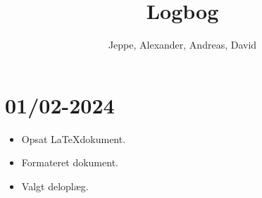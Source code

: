 \documentclass[12pt, a4paper]{article}
\title{Logbog}
\author{Jeppe, Alexander, Andreas, David}
\date{}
\begin{document}
    \maketitle
    \tableofcontents
    \newpage

    \section{01/02-2024}
        \begin{itemize}
            \item Opsat \LaTeX dokument.
            \item Formateret dokument.
            \item Valgt deloplæg.
        \end{itemize}
\end{document}
